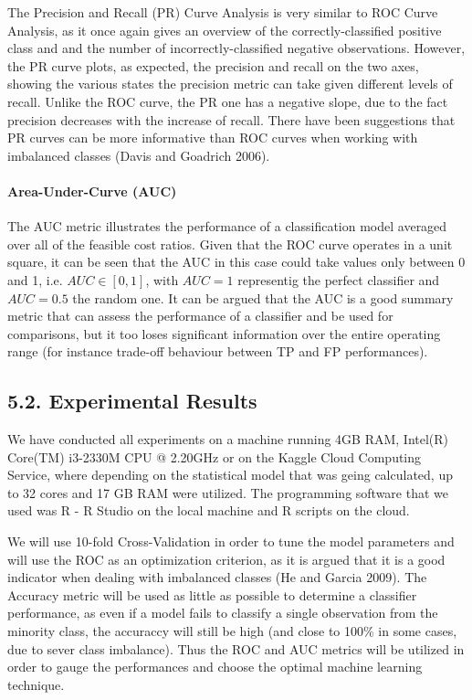 \documentclass[12pt,]{article}
\let\oldparagraph\paragraph
\renewcommand{\paragraph}[1]{\oldparagraph{#1}\mbox{}}
\begin{document}
The Precision and Recall (PR) Curve Analysis is very similar to ROC
Curve Analysis, as it once again gives an overview of the
correctly-classified positive class and and the number of
incorrectly-classified negative observations. However, the PR curve
plots, as expected, the precision and recall on the two axes, showing
the various states the precision metric can take given different levels
of recall. Unlike the ROC curve, the PR one has a negative slope, due to
the fact precision decreases with the increase of recall. There have
been suggestions that PR curves can be more informative than ROC curves
when working with imbalanced classes (Davis and Goadrich 2006).

\hypertarget{area-under-curve-auc}{%
\paragraph{Area-Under-Curve (AUC)}\label{area-under-curve-auc}}

The AUC metric illustrates the performance of a classification model
averaged over all of the feasible cost ratios. Given that the ROC curve
operates in a unit square, it can be seen that the AUC in this case
could take values only between 0 and 1, i.e. \(AUC \in [0,1]\), with
\(AUC=1\) representig the perfect classifier and \(AUC=0.5\) the random
one. It can be argued that the AUC is a good summary metric that can
assess the performance of a classifier and be used for comparisons, but
it too loses significant information over the entire operating range
(for instance trade-off behaviour between TP and FP performances).

\hypertarget{experimental-results}{%
\subsection{5.2. Experimental Results}\label{experimental-results}}

We have conducted all experiments on a machine running 4GB RAM, Intel(R)
Core(TM) i3-2330M CPU @ 2.20GHz or on the Kaggle Cloud Computing
Service, where depending on the statistical model that was geing
calculated, up to 32 cores and 17 GB RAM were utilized. The programming
software that we used was R - R Studio on the local machine and R
scripts on the cloud.

We will use 10-fold Cross-Validation in order to tune the model
parameters and will use the ROC as an optimization criterion, as it is
argued that it is a good indicator when dealing with imbalanced classes
(He and Garcia 2009). The Accuracy metric will be used as little as
possible to determine a classifier performance, as even if a model fails
to classify a single observation from the minority class, the accuraccy
will still be high (and close to 100\% in some cases, due to sever class
imbalance). Thus the ROC and AUC metrics will be utilized in order to
gauge the performances and choose the optimal machine learning
technique.
\end{document}
